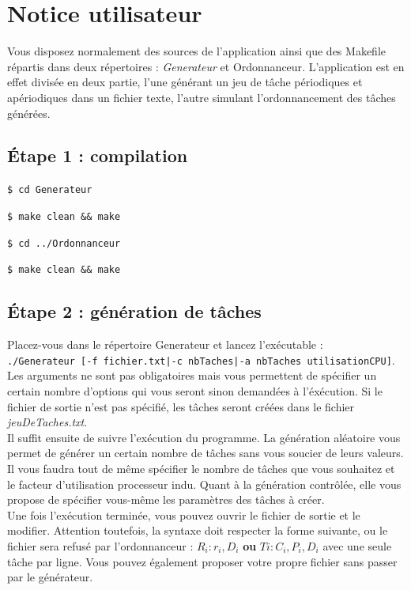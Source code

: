\chapter{Notice utilisateur}

	Vous disposez normalement des sources de l'application ainsi que des Makefile répartis dans deux répertoires : \emph{Generateur} et {Ordonnanceur}. L'application est en effet divisée en deux partie, l'une générant un jeu de tâche périodiques et apériodiques dans un fichier texte, l'autre simulant l'ordonnancement des tâches générées.

	\section{Étape 1 : compilation}
		\texttt{\$ cd Generateur}
		
		\texttt{\$ make clean \&\& make}
		
		\texttt{\$ cd ../Ordonnanceur}
		
		\texttt{\$ make clean \&\& make}
		
	\section{Étape 2 : génération de tâches}
		
		Placez-vous dans le répertoire Generateur et lancez l'exécutable :\\
		\verb+./Generateur [-f fichier.txt|-c nbTaches|-a nbTaches utilisationCPU]+.\\
		Les arguments ne sont pas obligatoires mais vous permettent de spécifier un certain nombre d'options qui vous seront sinon demandées à l'éxécution. Si le fichier de sortie n'est pas spécifié, les tâches seront créées dans le fichier \emph{jeuDeTaches.txt}.\\
		
		Il suffit ensuite de suivre l'exécution du programme. La génération aléatoire vous permet de générer un certain nombre de tâches sans vous soucier de leurs valeurs. Il vous faudra tout de même spécifier le nombre de tâches que vous souhaitez et le facteur d'utilisation processeur indu. Quant à la génération contrôlée, elle vous propose de spécifier vous-même les paramètres des tâches à créer.\\
		
		Une fois l'exécution terminée, vous pouvez ouvrir le fichier de sortie et le modifier. Attention toutefois, la syntaxe doit respecter la forme suivante, ou le fichier sera refusé par l'ordonnanceur : $R_i: r_i,D_i$ \textbf{ou} $Ti: C_i,P_i,D_i$ avec une seule tâche par ligne. Vous pouvez également proposer votre propre fichier sans passer par le générateur.
		
